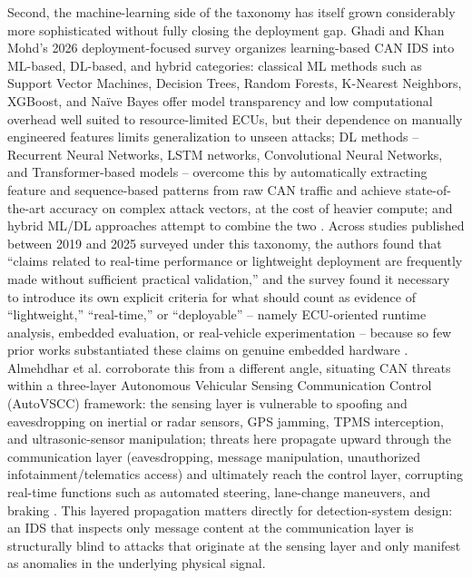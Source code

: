 \documentclass[journal]{IEEEtran}
\begin{document}
	Second, the machine-learning side of the taxonomy has itself grown
	considerably more sophisticated without fully closing the deployment
	gap. Ghadi and Khan Mohd's 2026 deployment-focused survey organizes
	learning-based CAN IDS into ML-based, DL-based, and hybrid categories:
	classical ML methods such as Support Vector Machines, Decision Trees,
	Random Forests, K-Nearest Neighbors, XGBoost, and Naïve Bayes offer model
	transparency and low computational overhead well suited to
	resource-limited ECUs, but their dependence on manually engineered
	features limits generalization to unseen attacks; DL methods -- Recurrent
	Neural Networks, LSTM networks, Convolutional Neural Networks, and
	Transformer-based models -- overcome this by automatically extracting
	feature and sequence-based patterns from raw CAN traffic and achieve
	state-of-the-art accuracy on complex attack vectors, at the cost of
	heavier compute; and hybrid ML/DL approaches attempt to combine the two
	\cite{ref7}. Across studies published between 2019 and 2025 surveyed
	under this taxonomy, the authors found that ``claims related to
	real-time performance or lightweight deployment are frequently made
	without sufficient practical validation,'' and the survey found it
	necessary to introduce its own explicit criteria for what should count
	as evidence of ``lightweight,'' ``real-time,'' or ``deployable'' --
	namely ECU-oriented runtime analysis, embedded evaluation, or
	real-vehicle experimentation -- because so few prior works substantiated
	these claims on genuine embedded hardware \cite{ref7}. Almehdhar et al.
	corroborate this from a different angle, situating CAN threats within a
	three-layer Autonomous Vehicular Sensing Communication Control
	(AutoVSCC) framework: the sensing layer is vulnerable to spoofing and
	eavesdropping on inertial or radar sensors, GPS jamming, TPMS
	interception, and ultrasonic-sensor manipulation; threats here propagate
	upward through the communication layer (eavesdropping, message
	manipulation, unauthorized infotainment/telematics access) and
	ultimately reach the control layer, corrupting real-time functions such
	as automated steering, lane-change maneuvers, and braking \cite{ref8}.
	This layered propagation matters directly for detection-system design:
	an IDS that inspects only message content at the communication layer is
	structurally blind to attacks that originate at the sensing layer and
	only manifest as anomalies in the underlying physical signal.
	
\end{document}
